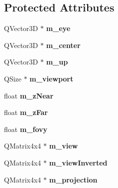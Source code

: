 \subsection*{Protected Attributes}
\begin{DoxyCompactItemize}
\item 
\hypertarget{class_camera_a227e5fd463e3bea92f376d8a9d7cee7e}{}Q\+Vector3\+D $\ast$ {\bfseries m\+\_\+eye}\label{class_camera_a227e5fd463e3bea92f376d8a9d7cee7e}

\item 
\hypertarget{class_camera_a7048a9ea478532b36678d4d2d07c6dd6}{}Q\+Vector3\+D $\ast$ {\bfseries m\+\_\+center}\label{class_camera_a7048a9ea478532b36678d4d2d07c6dd6}

\item 
\hypertarget{class_camera_af30016ca4d7348e14462f3147add42ec}{}Q\+Vector3\+D $\ast$ {\bfseries m\+\_\+up}\label{class_camera_af30016ca4d7348e14462f3147add42ec}

\item 
\hypertarget{class_camera_ac6968a6be1441d8947d3376e983c592e}{}Q\+Size $\ast$ {\bfseries m\+\_\+viewport}\label{class_camera_ac6968a6be1441d8947d3376e983c592e}

\item 
\hypertarget{class_camera_ae77d866ea9d0aa75853c8243154fca82}{}float {\bfseries m\+\_\+z\+Near}\label{class_camera_ae77d866ea9d0aa75853c8243154fca82}

\item 
\hypertarget{class_camera_aa1aaffbfe1f859ff06ae57f7c1faa208}{}float {\bfseries m\+\_\+z\+Far}\label{class_camera_aa1aaffbfe1f859ff06ae57f7c1faa208}

\item 
\hypertarget{class_camera_ae537e927f6648b6ce7054e0ff54442b9}{}float {\bfseries m\+\_\+fovy}\label{class_camera_ae537e927f6648b6ce7054e0ff54442b9}

\item 
\hypertarget{class_camera_ac11306608e9187c2ff52e0b949cdc5b3}{}Q\+Matrix4x4 $\ast$ {\bfseries m\+\_\+view}\label{class_camera_ac11306608e9187c2ff52e0b949cdc5b3}

\item 
\hypertarget{class_camera_a06be12235980a27d0e529de166117b3e}{}Q\+Matrix4x4 $\ast$ {\bfseries m\+\_\+view\+Inverted}\label{class_camera_a06be12235980a27d0e529de166117b3e}

\item 
\hypertarget{class_camera_a23f540bd415235c5b917322e8a333996}{}Q\+Matrix4x4 $\ast$ {\bfseries m\+\_\+projection}\label{class_camera_a23f540bd415235c5b917322e8a333996}


\end{DoxyCompactItemize}
